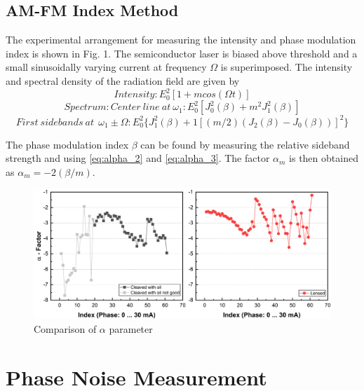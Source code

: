 \subsection{AM-FM Index Method}
The experimental arrangement for measuring the intensity and phase modulation index is shown in Fig. 1. The semiconductor laser is biased above threshold and a small sinusoidally varying current at frequency $\Omega$ is superimposed. The intensity and spectral density of the radiation field are given by
\begin{equation}
    Intensity: E_0^2[1+mcos(\Omega t)]
\end{equation}
\begin{equation}
    Spectrum: Center \ line \ at \ \omega_1: E_0^2[J_0^2(\beta)+m^2J_1^2(\beta)]
    \label{eq:alpha_2}
\end{equation}
\begin{equation}
    First \ sidebands \ at \
    \ \omega_1 \pm \Omega: E_0^2\big\{J_1^2(\beta)+1[(m/2)(J_2(\beta)-J_0(\beta))]^2\big\}
    \label{eq:alpha_3}
\end{equation}

The phase modulation index $\beta$ can be found by measuring the relative sideband strength and using \autoref{eq:alpha_2} and \autoref{eq:alpha_3}. The factor $\alpha_m$ is then obtained as $\alpha_m = -2(\beta/m)$.
\begin{figure}[ht]
    \centering
    \includegraphics[width=\linewidth]{figures/Alpha_Cleaved_and_Lensed.png}
    \caption{Comparison of $\alpha$ parameter}
    \label{fig:Alpha_Cleaved_and_Lensed}
\end{figure}

\section{Phase Noise Measurement}


